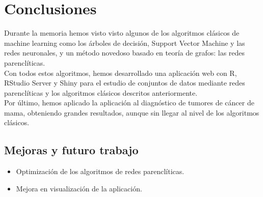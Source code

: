\chapter{Conclusiones}
Durante la memoria hemos visto visto algunos de los algoritmos clásicos de machine learning como los árboles de decisión, Support  Vector Machine y las redes neuronales, y un método novedoso basado en teoría de grafos: las redes parenclíticas.\\

Con todos estos algoritmos, hemos desarrollado una aplicación web con R, RStudio Server y Shiny para el estudio de conjuntos de datos mediante redes parenclíticas y los algoritmos clásicos descritos anteriormente.\\

Por último, hemos aplicado la aplicación al diagnóstico de tumores de cáncer de mama, obteniendo grandes resultados, aunque sin llegar al nivel de los algoritmos clásicos.
   
\section{Mejoras y futuro trabajo}

\begin{itemize}
	\item Optimización de los algoritmos de redes parenclíticas.
	\item Mejora en visualización de la aplicación.
\end{itemize}